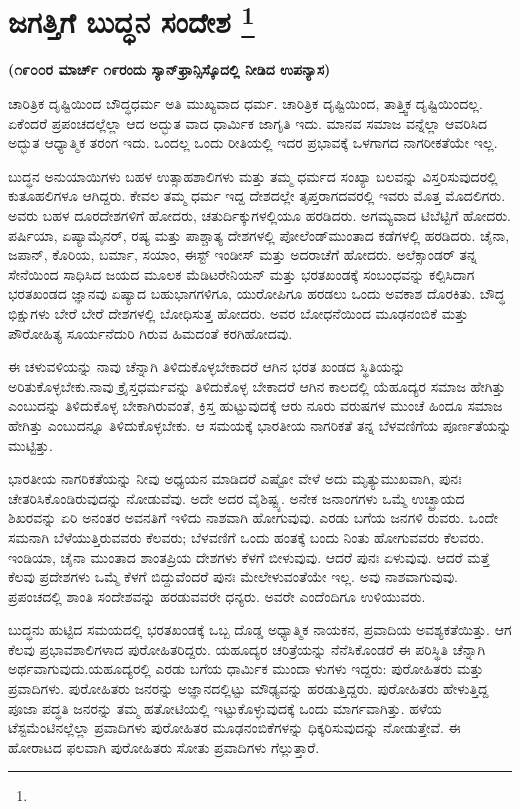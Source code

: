 
\chapter[ಜಗತ್ತಿಗೆ ಬುದ್ಧನ ಸಂದೇಶ ]{ಜಗತ್ತಿಗೆ ಬುದ್ಧನ ಸಂದೇಶ \protect\footnote{}}

\centerline{\textbf{(೧೯೦೦ರ ಮಾರ್ಚ್​ ೧೯ರಂದು ಸ್ಯಾನ್​ಫ್ರಾನ್ಸಿಸ್ಕೊದಲ್ಲಿ ನೀಡಿದ ಉಪನ್ಯಾಸ)}}

ಚಾರಿತ್ರಿಕ ದೃಷ್ಟಿಯಿಂದ ಬೌದ್ಧಧರ್ಮ ಅತಿ ಮುಖ್ಯವಾದ ಧರ್ಮ. ಚಾರಿತ್ರಿಕ ದೃಷ್ಟಿಯಿಂದ, ತಾತ್ತ್ವಿಕ ದೃಷ್ಟಿಯಿಂದಲ್ಲ. ಏಕೆಂದರೆ ಪ್ರಪಂಚದಲ್ಲೆಲ್ಲಾ ಆದ ಅದ್ಭುತ ವಾದ ಧಾರ್ಮಿಕ ಜಾಗೃತಿ ಇದು. ಮಾನವ ಸಮಾಜ ವನ್ನೆಲ್ಲಾ ಆವರಿಸಿದ ಅದ್ಭುತ ಆಧ್ಯಾತ್ಮಿಕ ತರಂಗ ಇದು. ಒಂದಲ್ಲ ಒಂದು ರೀತಿಯಲ್ಲಿ ಇದರ ಪ್ರಭಾವಕ್ಕೆ ಒಳಗಾಗದ ನಾಗರೀಕತೆಯೇ ಇಲ್ಲ.

ಬುದ್ಧನ ಅನುಯಾಯಿಗಳು ಬಹಳ ಉತ್ಸಾಹಶಾಲಿಗಳು ಮತ್ತು ತಮ್ಮ ಧರ್ಮದ ಸಂಖ್ಯಾ ಬಲವನ್ನು ವಿಸ್ತರಿಸುವುದರಲ್ಲಿ ಕುತೂಹಲಿಗಳೂ ಆಗಿದ್ದರು. ಕೇವಲ ತಮ್ಮ ಧರ್ಮ ಇದ್ದ ದೇಶದಲ್ಲೇ ತೃಪ್ತರಾಗದವರಲ್ಲಿ ಇವರು ಮೊತ್ತ ಮೊದಲಿಗರು. ಅವರು ಬಹಳ ದೂರದೇಶಗಳಿಗೆ ಹೋದರು, ಚತುರ್ದಿಕ್ಕುಗಳಲ್ಲಿಯೂ ಹರಡಿದರು. ಅಗಮ್ಯವಾದ ಟಿಬೆಟ್ಟಿಗೆ ಹೋದರು. ಪರ್ಷಿಯಾ, ಏಷ್ಯಾಮೈನರ್​, ರಷ್ಯ ಮತ್ತು ಪಾಶ್ಚಾತ್ಯ ದೇಶಗಳಲ್ಲಿ ಪೋಲೆಂಡ್​ ಮುಂತಾದ ಕಡೆಗಳಲ್ಲಿ ಹರಡಿದರು. ಚೈನಾ, ಜಪಾನ್​, ಕೊರಿಯ, ಬರ್ಮಾ, ಸಯಾಂ, ಈಸ್ಟ್​ ಇಂಡೀಸ್​ ಮತ್ತು ಅದರಾಚೆಗೆ ಹೋದರು. ಅಲೆಕ್ಸಾಂಡರ್​ ತನ್ನ ಸೇನೆಯಿಂದ ಸಾಧಿಸಿದ ಜಯದ ಮೂಲಕ ಮೆಡಿಟರೇನಿಯನ್​ ಮತ್ತು ಭರತಖಂಡಕ್ಕೆ ಸಂಬಂಧವನ್ನು ಕಲ್ಪಿಸಿದಾಗ ಭರತಖಂಡದ ಜ್ಞಾನವು ಏಷ್ಯಾದ ಬಹುಭಾಗಗಳಿಗೂ, ಯುರೋಪಿಗೂ ಹರಡಲು ಒಂದು ಅವಕಾಶ ದೊರಕಿತು. ಬೌದ್ಧ ಭಿಕ್ಷುಗಳು ಬೇರೆ ಬೇರೆ ದೇಶಗಳಲ್ಲಿ ಬೋಧಿಸುತ್ತ ಹೋದರು. ಅವರ ಬೋಧನೆಯಿಂದ ಮೂಢನಂಬಿಕೆ ಮತ್ತು ಪೌರೋಹಿತ್ಯ ಸೂರ್ಯನೆದುರಿ ಗಿರುವ ಹಿಮದಂತೆ ಕರಗಿಹೋದವು.

ಈ ಚಳುವಳಿಯನ್ನು ನಾವು ಚೆನ್ನಾಗಿ ತಿಳಿದುಕೊಳ್ಳಬೇಕಾದರೆ ಆಗಿನ ಭರತ ಖಂಡದ ಸ್ಥಿತಿಯನ್ನು ಅರಿತುಕೊಳ್ಳಬೇಕು.ನಾವು ಕ್ರೈಸ್ತಧರ್ಮವನ್ನು ತಿಳಿದುಕೊಳ್ಳ ಬೇಕಾದರೆ ಆಗಿನ ಕಾಲದಲ್ಲಿ ಯೆಹೂದ್ಯರ ಸಮಾಜ ಹೇಗಿತ್ತು ಎಂಬುದನ್ನು ತಿಳಿದುಕೊಳ್ಳ ಬೇಕಾಗಿರುವಂತೆ, ಕ್ರಿಸ್ತ ಹುಟ್ಟುವುದಕ್ಕೆ ಆರು ನೂರು ವರುಷಗಳ ಮುಂಚೆ ಹಿಂದೂ ಸಮಾಜ ಹೇಗಿತ್ತು ಎಂಬುದನ್ನೂ ತಿಳಿದುಕೊಳ್ಳಬೇಕು. ಆ ಸಮಯಕ್ಕೆ ಭಾರತೀಯ ನಾಗರಿಕತೆ ತನ್ನ ಬೆಳವಣಿಗೆಯ ಪೂರ್ಣತೆಯನ್ನು ಮುಟ್ಟಿತ್ತು.

ಭಾರತೀಯ ನಾಗರಿಕತೆಯನ್ನು ನೀವು ಅಧ್ಯಯನ ಮಾಡಿದರೆ ಎಷ್ಟೋ ವೇಳೆ ಅದು ಮೃತ್ಯುಮುಖವಾಗಿ, ಪುನಃ ಚೇತರಿಸಿಕೊಂಡಿರುವುದನ್ನು ನೋಡುವೆವು. ಅದೇ ಅದರ ವೈಶಿಷ್ಟ್ಯ. ಅನೇಕ ಜನಾಂಗಗಳು ಒಮ್ಮೆ ಉಚ್ಛ್ರಾಯದ ಶಿಖರವನ್ನು ಏರಿ ಅನಂತರ ಅವನತಿಗೆ ಇಳಿದು ನಾಶವಾಗಿ ಹೋಗುವುವು. ಎರಡು ಬಗೆಯ ಜನಗಳಿ ರುವರು. ಒಂದೇ ಸಮನಾಗಿ ಬೆಳೆಯುತ್ತಿರುವವರು ಕೆಲವರು; ಬೆಳವಣಿಗೆ ಒಂದು ಹಂತಕ್ಕೆ ಬಂದು ನಿಂತು ಹೋಗುವವರು ಕೆಲವರು. ಇಂಡಿಯಾ, ಚೈನಾ ಮುಂತಾದ ಶಾಂತಪ್ರಿಯ ದೇಶಗಳು ಕೆಳಗೆ ಬೀಳುವುವು. ಆದರೆ ಪುನಃ ಏಳುವುವು. ಆದರೆ ಮತ್ತೆ ಕೆಲವು ಪ್ರದೇಶಗಳು ಒಮ್ಮೆ ಕೆಳಗೆ ಬಿದ್ದುವೆಂದರೆ ಪುನಃ ಮೇಲೇಳುವಂತೆಯೇ ಇಲ್ಲ. ಅವು ನಾಶವಾಗುವುವು. ಪ್ರಪಂಚದಲ್ಲಿ ಶಾಂತಿ ಸಂದೇಶವನ್ನು ಹರಡುವವರೇ ಧನ್ಯರು. ಅವರೇ ಎಂದೆಂದಿಗೂ ಉಳಿಯುವರು.

ಬುದ್ಧನು ಹುಟ್ಟಿದ ಸಮಯದಲ್ಲಿ ಭರತಖಂಡಕ್ಕೆ ಒಬ್ಬ ದೊಡ್ಡ ಅಧ್ಯಾತ್ಮಿಕ ನಾಯಕನ, ಪ್ರವಾದಿಯ ಅವಶ್ಯಕತೆಯಿತ್ತು. ಆಗ ಕೆಲವು ಪ್ರಭಾವಶಾಲಿಗಳಾದ ಪುರೋಹಿತರಿದ್ದರು. ಯಹೂದ್ಯರ ಚರಿತ್ರೆಯನ್ನು ನೆನೆಸಿಕೊಂಡರೆ ಈ ಪರಿಸ್ಥಿತಿ ಚೆನ್ನಾಗಿ ಅರ್ಥವಾಗುವುದು.ಯಹೂದ್ಯರಲ್ಲಿ ಎರಡು ಬಗೆಯ ಧಾರ್ಮಿಕ ಮುಂದಾ ಳುಗಳು ಇದ್ದರು: ಪುರೋಹಿತರು ಮತ್ತು ಪ್ರವಾದಿಗಳು. ಪುರೋಹಿತರು ಜನರನ್ನು ಅಜ್ಞಾನದಲ್ಲಿಟ್ಟು ಮೌಢ್ಯವನ್ನು ಹರಡುತ್ತಿದ್ದರು. ಪುರೋಹಿತರು ಹೇಳುತ್ತಿದ್ದ ಪೂಜಾ ಪದ್ಧತಿ ಜನರನ್ನು ತಮ್ಮ ಹತೋಟಿಯಲ್ಲಿ ಇಟ್ಟುಕೊಳ್ಳುವುದಕ್ಕೆ ಒಂದು ಮಾರ್ಗವಾಗಿತ್ತು. ಹಳೆಯ ಟೆಸ್ಟಮೆಂಟಿನಲ್ಲೆಲ್ಲಾ ಪ್ರವಾದಿಗಳು ಪುರೋಹಿತರ ಮೂಢನಂಬಿಕೆಗಳನ್ನು ಧಿಕ್ಕರಿಸುವುದನ್ನು ನೋಡುತ್ತೇವೆ. ಈ ಹೋರಾಟದ ಫಲವಾಗಿ ಪುರೋಹಿತರು ಸೋತು ಪ್ರವಾದಿಗಳು ಗೆಲ್ಲುತ್ತಾರೆ.

